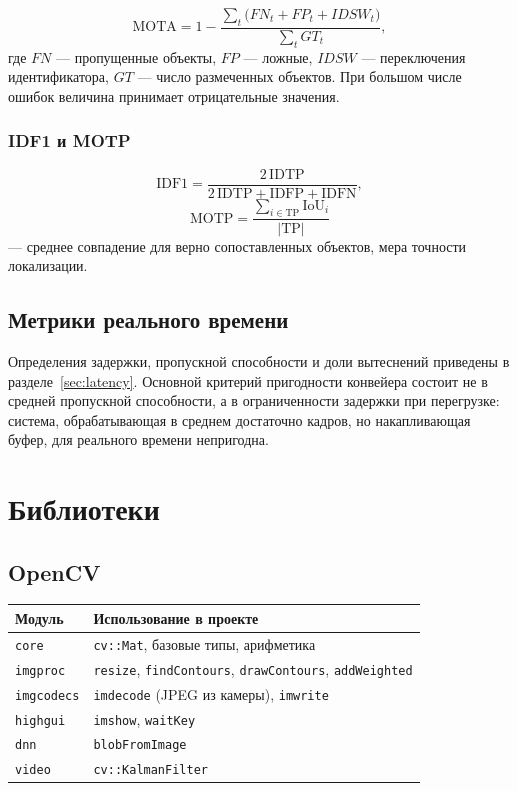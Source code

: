 \documentclass[11pt,a4paper]{article}
\theoremstyle{definition}
\theoremstyle{remark}
\begin{document}
\[
  \mathrm{MOTA} = 1 - \frac{\sum_t \bigl(FN_t + FP_t + IDSW_t\bigr)}{\sum_t GT_t},
\]
где $FN$ --- пропущенные объекты, $FP$ --- ложные, $IDSW$ --- переключения
идентификатора, $GT$ --- число размеченных объектов. При большом числе ошибок
величина принимает отрицательные значения.

\subsubsection{IDF1 и MOTP}

\[
  \mathrm{IDF1} = \frac{2\,\mathrm{IDTP}}{2\,\mathrm{IDTP} + \mathrm{IDFP} +
  \mathrm{IDFN}},
\]
\[
  \mathrm{MOTP} = \frac{\sum_{i \in \mathrm{TP}} \mathrm{IoU}_i}{|\mathrm{TP}|}
\]
--- среднее совпадение для верно сопоставленных объектов, мера точности
локализации.

\subsection{Метрики реального времени}

Определения задержки, пропускной способности и доли вытеснений приведены в
разделе~\ref{sec:latency}. Основной критерий пригодности конвейера состоит не
в средней пропускной способности, а в ограниченности задержки при
перегрузке: система, обрабатывающая в среднем достаточно кадров, но
накапливающая буфер, для реального времени непригодна.

\section{Библиотеки}
\label{sec:libs}

\subsection{OpenCV}

\begin{center}
\begin{tabular}{ll}
\toprule
Модуль & Использование в проекте \\
\midrule
\texttt{core} & \texttt{cv::Mat}, базовые типы, арифметика \\
\texttt{imgproc} & \texttt{resize}, \texttt{findContours},
                 \texttt{drawContours}, \texttt{addWeighted} \\
\texttt{imgcodecs} & \texttt{imdecode} (JPEG из камеры), \texttt{imwrite} \\
\texttt{highgui} & \texttt{imshow}, \texttt{waitKey} \\
\texttt{dnn} & \texttt{blobFromImage} \\
\texttt{video} & \texttt{cv::KalmanFilter} \\
\bottomrule
\end{tabular}
\end{center}
\end{document}
